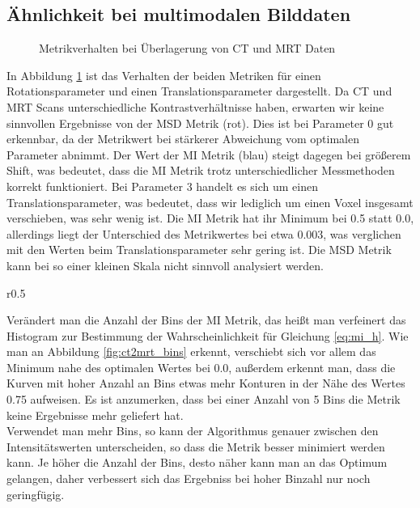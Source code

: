 \subsection{Ähnlichkeit bei multimodalen Bilddaten}
\begin{figure}[h]
  \caption{Metrikverhalten bei Überlagerung von CT und MRT Daten}
  \label{fig:ct2mrt_param}
  \vspace{-10pt}
  \resizebox{0.48\linewidth}{!}{}
  \hfill
  \resizebox{0.48\linewidth}{!}{}
  \vspace{-10pt}
\end{figure}
In Abbildung \ref{fig:ct2mrt_param} ist das Verhalten der beiden Metriken für
einen Rotationsparameter und einen Translationsparameter dargestellt. Da CT und
MRT Scans unterschiedliche Kontrastverhältnisse haben, erwarten wir keine
sinnvollen Ergebnisse von der MSD Metrik (rot). Dies ist bei Parameter \num{0}
gut erkennbar, da der Metrikwert bei stärkerer Abweichung vom optimalen
Parameter abnimmt. Der Wert der MI Metrik (blau) steigt dagegen bei größerem
Shift, was bedeutet, dass die MI Metrik trotz unterschiedlicher Messmethoden
korrekt funktioniert.
Bei Parameter \num{3} handelt es sich um einen Translationsparameter, was
bedeutet, dass wir lediglich um einen Voxel insgesamt verschieben, was sehr
wenig ist. Die MI Metrik hat ihr Minimum bei \num{0.5} statt \num{0.0},
allerdings liegt der Unterschied des Metrikwertes bei etwa \num{0.003}, was
verglichen mit den Werten beim Translationsparameter sehr gering ist. Die MSD
Metrik kann bei so einer kleinen Skala nicht sinnvoll analysiert werden.
\vspace{12pt}
\begin{wrapfigure}{r}{0.5\linewidth}
  \vspace{-6pt}
  \vspace{-10pt}
  \caption{Variation der Binanzahl beim MI Algorithmus führt bei hoher Anzahl nur noch zu geringen Veränderungen der Metrik}
  \label{fig:ct2mrt_bins}
  \vspace{-10pt}
  \resizebox{\linewidth}{!}{}
  \vspace{-30pt}
\end{wrapfigure}
Verändert man die Anzahl der Bins der MI Metrik, das heißt man verfeinert das
Histogram zur Bestimmung der Wahrscheinlichkeit für Gleichung \ref{eq:mi_h}.
Wie man an Abbildung \ref{fig:ct2mrt_bins} erkennt, verschiebt sich vor allem
das Minimum nahe des optimalen Wertes bei \num{0.0}, außerdem erkennt man, dass
die Kurven mit hoher Anzahl an Bins etwas mehr Konturen in der Nähe des Wertes
\num{0.75} aufweisen. Es ist anzumerken, dass bei einer Anzahl von \num{5} Bins
die Metrik keine Ergebnisse mehr geliefert hat.\\
Verwendet man mehr Bins, so kann der Algorithmus genauer zwischen den
Intensitätswerten unterscheiden, so dass die Metrik besser minimiert werden
kann. Je höher die Anzahl der Bins, desto näher kann man an das Optimum
gelangen, daher verbessert sich das Ergebniss bei hoher Binzahl nur noch
geringfügig.

